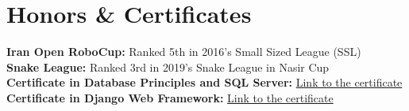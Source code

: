 
\section{Honors \& Certificates}
  \vspace{2pt}
  \resumeSubHeadingListStart
    \small{\item{
        \textbf{Iran Open RoboCup:} { Ranked 5th in 2016's Small Sized League (SSL)}
        \\ \vspace{3pt}
        \textbf{Snake League:} { Ranked 3rd in 2019's Snake League in Nasir Cup}
        \\ \vspace{3pt}
        \textbf{Certificate in Database Principles and SQL Server:} \href{https://maktabkhooneh.org/certificates/MK-O1USZA/?print=True}{\color{blue} Link to the certificate}
        \\ \vspace{3pt}
        \textbf{Certificate in Django Web Framework:} \href{https://www.coursera.org/account/accomplishments/verify/ZZDP44XE9B4G}{\color{blue} Link to the certificate}
    }}
  \resumeSubHeadingListEnd